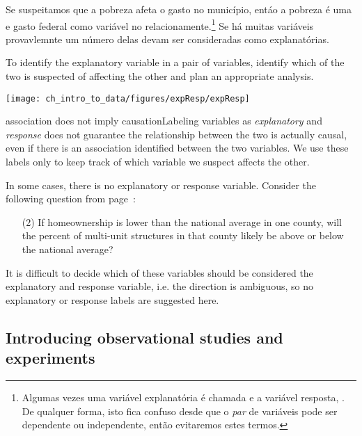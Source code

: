 Se suspeitamos que a pobreza afeta o gasto no município, entáo a pobreza é uma  e gasto federal como variável  no relacionamente.\footnote{Algumas vezes uma variável explanatória é chamada  e a variável resposta, . De qualquer forma, isto fica confuso desde que o \emph{par} de variáveis pode ser dependente ou independente, então evitaremos estes termos.} Se há muitas variáveis provavlemnte um número delas devam ser consideradas como explanatórias.

\begin{tipBox}{
To identify the explanatory variable in a pair of variables, identify which of the two is suspected of affecting the other and plan an appropriate analysis.

\hspace{10mm}\texttt{[image: ch\_intro\_to\_data/figures/expResp/expResp]}}
\end{tipBox}

\begin{caution}{association does not imply causation}{Labeling variables as \emph{explanatory} and \emph{response} does not guarantee the relationship between the two is actually causal, even if there is an association identified between the two variables. We use these labels only to keep track of which variable we suspect affects the other.}
\end{caution}

In some cases, there is no explanatory or response variable. Consider the following question from page~\pageref{ownershipMultiUnitQuestion}:
\begin{enumerate}
\item[(2)]
	If homeownership is lower than the national average in one county, will the percent of multi-unit structures in that county likely be above or below the national average?
\end{enumerate}
It is difficult to decide which of these variables should be considered the explanatory and response variable, i.e. the direction is ambiguous, so no explanatory or response labels are suggested here.


\subsection{Introducing observational studies and experiments}


